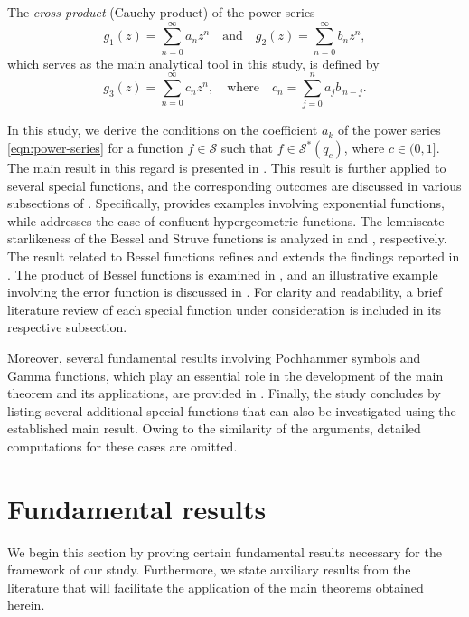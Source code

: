 \documentclass[a4paper,11pt,reqno]{amsart}
\begin{document}
The \emph{cross-product} (Cauchy product) of the power series 
\[
g_1(z) = \sum_{n=0}^{\infty} a_n z^n 
\quad \text{and} \quad 
g_2(z) = \sum_{n=0}^{\infty} b_n z^n,
\]
which serves as the main analytical tool in this study, is defined by
\[
g_3(z) = \sum_{n=0}^{\infty} c_n z^n, 
\quad \text{where} \quad 
c_n = \sum_{j=0}^{n} a_j b_{\,n-j}.
\]

In this study, we derive the conditions on the coefficient \( a_k \) of the power series \eqref{eqn:power-series} for a function \( f \in \mathcal{S} \) such that \( f \in \mathcal{S}^{\ast}(q_c) \), where \( c \in (0,1] \). The main result in this regard is presented in . This result is further applied to several special functions, and the corresponding outcomes are discussed in various subsections of . Specifically,  provides examples involving exponential functions, while  addresses the case of confluent hypergeometric functions. The lemniscate starlikeness of the Bessel and Struve functions is analyzed in  and , respectively. The result related to Bessel functions refines and extends the findings reported in \cite{Zayed-Bulboacua}. The product of Bessel functions is examined in , and an illustrative example involving the error function is discussed in . For clarity and readability, a brief literature review of each special function under consideration is included in its respective subsection.

Moreover, several fundamental results involving Pochhammer symbols and Gamma functions, which play an essential role in the development of the main theorem and its applications, are provided in . Finally, the study concludes by listing several additional special functions that can also be investigated using the established main result. Owing to the similarity of the arguments, detailed computations for these cases are omitted.









\section{Fundamental results}\label{sec:fundamental}
We begin this section by proving certain fundamental results necessary for the framework of our study. Furthermore, we state auxiliary results from the literature that will facilitate the application of the main theorems obtained herein.
\end{document}
